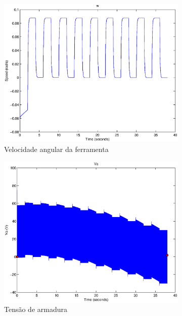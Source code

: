 \documentclass{article}
\begin{document}
\begin{figure}[H]
\begin{subfigure}{0.32\textwidth}
		\includegraphics[width=\linewidth]{matlab/w6}
		\caption{Velocidade angular da ferramenta}
	\end{subfigure}
	\begin{subfigure}{0.32\textwidth}
		\includegraphics[width=\linewidth]{matlab/va6}
		\caption{Tensão de armadura}
	\end{subfigure}
	\begin{subfigure}{0.32\textwidth}

\end{subfigure}
\end{figure}
\end{document}

